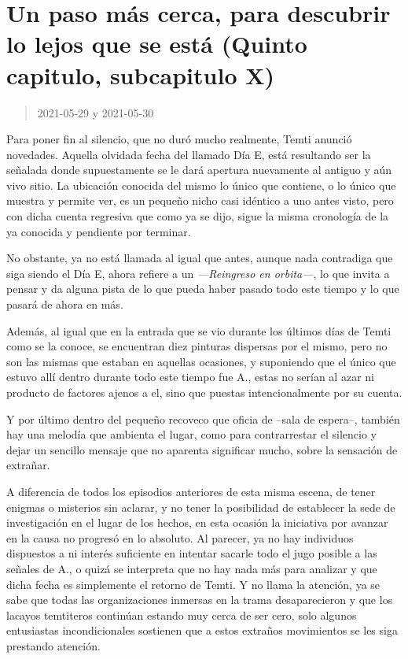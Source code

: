 \documentclass[
  spanish,
]{book}
\begin{document}
\hypertarget{un-paso-muxe1s-cerca-para-descubrir-lo-lejos-que-se-estuxe1-quinto-capitulo-subcapitulo-x}{%
\section{Un paso más cerca, para descubrir lo lejos que se está (Quinto capitulo, subcapitulo X)}\label{un-paso-muxe1s-cerca-para-descubrir-lo-lejos-que-se-estuxe1-quinto-capitulo-subcapitulo-x}}

\begin{quote}
2021-05-29 y 2021-05-30
\end{quote}

Para poner fin al silencio, que no duró mucho realmente, Temti anunció novedades. Aquella olvidada fecha del llamado Día E, está resultando ser la señalada donde supuestamente se le dará apertura nuevamente al antiguo y aún vivo sitio. La ubicación conocida del mismo lo único que contiene, o lo único que muestra y permite ver, es un pequeño nicho casi idéntico a uno antes visto, pero con dicha cuenta regresiva que como ya se dijo, sigue la misma cronología de la ya conocida y pendiente por terminar.

No obstante, ya no está llamada al igual que antes, aunque nada contradiga que siga siendo el Día E, ahora refiere a un \emph{---Reingreso en orbita---}, lo que invita a pensar y da alguna pista de lo que pueda haber pasado todo este tiempo y lo que pasará de ahora en más.

Además, al igual que en la entrada que se vio durante los últimos días de Temti como se la conoce, se encuentran diez pinturas dispersas por el mismo, pero no son las mismas que estaban en aquellas ocasiones, y suponiendo que el único que estuvo allí dentro durante todo este tiempo fue A., estas no serían al azar ni producto de factores ajenos a el, sino que puestas intencionalmente por su cuenta.

Y por último dentro del pequeño recoveco que oficia de --sala de espera--, también hay una melodía que ambienta el lugar, como para contrarrestar el silencio y dejar un sencillo mensaje que no aparenta significar mucho, sobre la sensación de extrañar.

A diferencia de todos los episodios anteriores de esta misma escena, de tener enigmas o misterios sin aclarar, y no tener la posibilidad de establecer la sede de investigación en el lugar de los hechos, en esta ocasión la iniciativa por avanzar en la causa no progresó en lo absoluto. Al parecer, ya no hay individuos dispuestos a ni interés suficiente en intentar sacarle todo el jugo posible a las señales de A., o quizá se interpreta que no hay nada más para analizar y que dicha fecha es simplemente el retorno de Temti. Y no llama la atención, ya se sabe que todas las organizaciones inmersas en la trama desaparecieron y que los lacayos temtiteros continúan estando muy cerca de ser cero, solo algunos entusiastas incondicionales sostienen que a estos extraños movimientos se les siga prestando atención.
\end{document}
